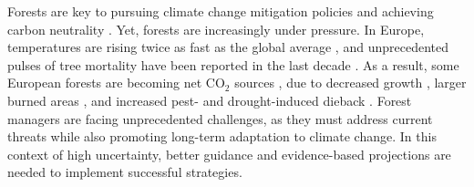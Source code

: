 \documentclass[11pt,letter]{article}
\begin{document}

Forests are key to pursuing climate change mitigation policies and achieving carbon neutrality  \citep{Korosuo2023, Hyyrynen2023}. Yet, forests are increasingly under pressure. In Europe, temperatures are rising twice as fast as the global average \citep{CCCS2024}, and unprecedented pulses of tree mortality  have been reported in the last decade \citep{Senf2020}. As a result, some European forests are becoming net CO$_2$ sources \citep{Hadden2016, Karelin2021}, due to decreased growth \citep{Hadden2016, Woude2023}, larger burned areas \citep{Carnicer2022, Kelly2024}, and increased pest- and drought-induced dieback \citep{Karelin2021, Cienciala2024, Latifovic2024}. Forest managers are facing unprecedented challenges, as they must address current threats while also promoting long-term adaptation to climate change. In this context of high uncertainty, better guidance and evidence-based projections are needed to implement successful strategies.
\end{document}

